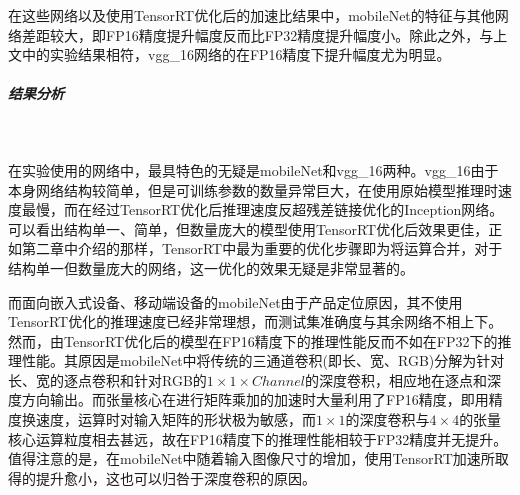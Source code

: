 \par 在这些网络以及使用TensorRT优化后的加速比结果中，mobileNet的特征与其他网络差距较大，即FP16精度提升幅度反而比FP32精度提升幅度小。除此之外，与上文中的实验结果相符，vgg\_16网络的在FP16精度下提升幅度尤为明显。
\subparagraph{结果分析}~{}
\par 在实验使用的网络中，最具特色的无疑是mobileNet和vgg\_16两种。vgg\_16由于本身网络结构较简单，但是可训练参数的数量异常巨大，在使用原始模型推理时速度最慢，而在经过TensorRT优化后推理速度反超残差链接优化的Inception网络。可以看出结构单一、简单，但数量庞大的模型使用TensorRT优化后效果更佳，正如第二章中介绍的那样，TensorRT中最为重要的优化步骤即为将运算合并，对于结构单一但数量庞大的网络，这一优化的效果无疑是非常显著的。
\par 而面向嵌入式设备、移动端设备的mobileNet由于产品定位原因，其不使用TensorRT优化的推理速度已经非常理想，而测试集准确度与其余网络不相上下。然而，由TensorRT优化后的模型在FP16精度下的推理性能反而不如在FP32下的推理性能。其原因是mobileNet中将传统的三通道卷积(即长、宽、RGB)分解为针对长、宽的逐点卷积和针对RGB的$ 1\times 1\times Channel $的深度卷积，相应地在逐点和深度方向输出。而张量核心在进行矩阵乘加的加速时大量利用了FP16精度，即用精度换速度，运算时对输入矩阵的形状极为敏感，而$ 1\times 1 $的深度卷积与$ 4 \times 4 $的张量核心运算粒度相去甚远，故在FP16精度下的推理性能相较于FP32精度并无提升。值得注意的是，在mobileNet中随着输入图像尺寸的增加，使用TensorRT加速所取得的提升愈小，这也可以归咎于深度卷积的原因。

